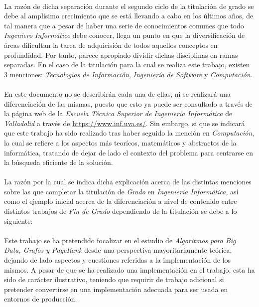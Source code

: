 \documentclass{subfiles}
\begin{document}
    \paragraph{}
    La razón de dicha separación durante el segundo ciclo de la titulación de grado se debe al amplísimo crecimiento que se está llevando a cabo en los últimos años, de tal manera que a pesar de haber una serie de conocimientos comunes que todo \emph{Ingeniero Informático} debe conocer, llega un punto en que la diversificación de áreas dificultan la tarea de adquicisión de todos aquellos conceptos en profundidad. Por tanto, parece apropiado dividir dichas disciplinas en ramas separadas. En el caso de la titulación para la cual se realiza este trabajo, existen 3 menciones: \emph{Tecnologías de Información}, \emph{Ingeniería de Software} y \emph{Computación}.

    \paragraph{}
    En este documento no se describirán cada una de ellas, ni se realizará una diferenciación de las mismas, puesto que esto ya puede ser consultado a través de la página web de la \emph{Escuela Técnica Superior de Ingeniería Informática} de \emph{Valladolid} a través de \url{https://www.inf.uva.es/}. Sin embargo, si que se indicará que este trabajo ha sido realizado tras haber seguido la mención en \emph{Computación}, la cual se refiere a los aspectos más teorícos, matemáticos y abstractos de la informática, tratando de dejar de lado el contexto del problema para centrarse en la búsqueda eficiente de la solución.

    \paragraph{}
    La razón por la cual se indica dicha explicación acerca de las distintas menciones sobre las que completar la titulación de \emph{Grado} en \emph{Ingeniería Informática}, así como el ejemplo inicial acerca de la diferenciación a nivel de contenido entre distintos trabajos de \emph{Fin de Grado} dependiendo de la titulación se debe a lo siguiente:

    \paragraph{}
    Este trabajo se ha pretendido focalizar en el estudio de \emph{Algoritmos para Big Data, Grafos y PageRank} desde una perspectiva mayoritariamente teórica, dejando de lado aspectos y cuestiones referidas a la implementación de los mismos. A pesar de que se ha realizado una implementación en el trabajo, esta ha sido de carácter ilustrativo, teniendo que requirir de trabajo adicional si pretender convertirse en una implementación adecuada para ser usada en entornos de producción.
\end{document}
